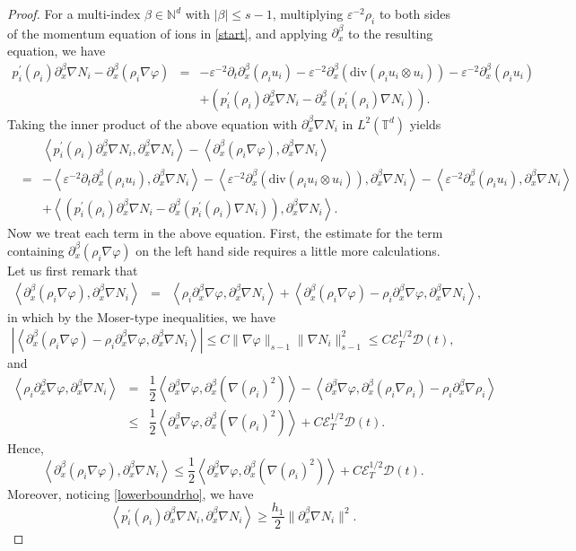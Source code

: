 \documentclass[reqno,twoside,12pt,a4paper]{amsart}
\newcommand{\N}{\mathbb{N}}
\newcommand{\T}{\mathbb{T}}
\newcommand{\eps}{\mathbb{\varepsilon}}
\newcommand{\dive}{\mathrm{div}}
\newcommand{\pt}{\partial_t}
\newcommand{\pa}{\partial}
\newcommand{\D}{\nabla}
\newcommand{\vp}{\varphi}
\newcommand{\cubic}{C\mathscr{E}_T^{1/2}\mathscr{D}(t)}
\numberwithin{equation}{section}
\begin{document}
\begin{proof}For a multi-index $\beta\in\N^d$ with $|\beta|\leq s-1$, multiplying $\eps^{-2}\rho_i$ to both sides of the momentum equation of ions in \eqref{start}, and applying $\pa_x^\beta$ to the resulting equation, we have
\begin{eqnarray*}
p_i^\prime(\rho_i)\pa_x^\beta \nabla N_i-\pa_x^\beta (\rho_i\D\vp) &=&-\eps^{-2}\pt\pa_x^\beta(\rho_i u_i)-\eps^{-2}\pa_x^\beta(\dive(\rho_i u_i\otimes u_i))-\eps^{-2}\pa_x^\beta (\rho_iu_i)\nonumber\\
&\,&+\left(p_i^\prime(\rho_i)\pa_x^\beta \nabla N_i-\pa_x^\beta(p_i^\prime(\rho_i)\nabla N_i)\right).
\end{eqnarray*}
Taking the inner product of the above equation with $\pa_x^\beta\nabla N_i$ in $L^2(\T^d)$ yields
\begin{eqnarray}\label{dissstart}
&\,&\left<p_i^\prime(\rho_i)\pa_x^\beta \nabla N_i, \pa_x^\beta\nabla N_i\right>
-\left<\pa_x^\beta (\rho_i\D\vp) , \pa_x^\beta\nabla N_i\right>\nonumber\\
&=&-\left<\eps^{-2}\pt\pa_x^\beta(\rho_i u_i), \pa_x^\beta\nabla N_i\right>-\left<\eps^{-2}\pa_x^\beta(\dive(\rho_i u_i\otimes u_i)), \pa_x^\beta\nabla N_i\right>
-\left<\eps^{-2}\pa_x^\beta (\rho_iu_i), \pa_x^\beta\nabla N_i\right>\nonumber\\
&\,&+\left<\left(p_i^\prime(\rho_i)\pa_x^\beta \nabla N_i
-\pa_x^\beta(p_i^\prime(\rho_i)\nabla N_i)\right), \pa_x^\beta\nabla N_i\right>.
\end{eqnarray}
Now we treat each term in the above equation. First, the estimate for the term containing $\pa_x^\beta(\rho_i \D\vp)$ on the left hand side requires a little more calculations. Let us first remark that
\begin{eqnarray*}
\left<\pa_x^\beta (\rho_i \D\vp), \pa_x^\beta \nabla N_i\right>
&=&\left<\rho_i \pa_x^\beta \D\vp, \pa_x^\beta \nabla N_i\right>+\left<\pa_x^\beta(\rho_i \D\vp)-\rho_i \pa_x^\beta \D\vp, \pa_x^\beta \nabla N_i\right>,
\end{eqnarray*}
in which by the Moser-type inequalities, we have
\[
\left|\left<\pa_x^\beta(\rho_i \D\vp)-\rho_i \pa_x^\beta \D\vp, \pa_x^\beta \nabla N_i\right>\right|\leq C\|\D\vp\|_{s-1}\|\nabla N_i\|_{s-1}^2\leq \cubic,
\]
and
\begin{eqnarray*}
\left<\rho_i \pa_x^\beta \D\vp, \pa_x^\beta \nabla N_i\right>
&=&\dfrac{1}{2}\left<\pa_x^\beta \D\vp, \pa_x^\beta(\nabla (\rho_i)^2)\right>-\left<\pa_x^\beta \D\vp, \pa_x^\beta(\rho_i\nabla \rho_i)-\rho_i\pa_x^\beta \nabla \rho_i\right>\nonumber\\
&\leq& \dfrac{1}{2}\left<\pa_x^\beta \D\vp, \pa_x^\beta(\nabla (\rho_i)^2)\right>+\cubic.
\nonumber
\end{eqnarray*}
Hence,
\begin{equation*}
\left<\pa_x^\beta (\rho_i \D\vp), \pa_x^\beta \nabla N_i\right>\leq \dfrac{1}{2}\left<\pa_x^\beta \D\vp, \pa_x^\beta(\nabla (\rho_i)^2)\right>+\cubic.
\end{equation*}
Moreover, noticing \eqref{lowerboundrho}, we have
\[
\left<p_i^\prime(\rho_i)\pa_x^\beta \nabla N_i, \pa_x^\beta \nabla N_i\right> \geq \dfrac{h_1}{2}\|\pa_x^\beta \nabla N_i\|^2.
\]


\end{proof}
\end{document}

